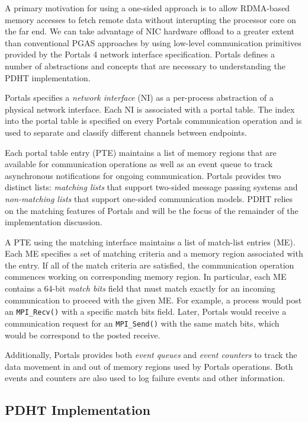 A primary motivation for using a one-sided approach is to allow
RDMA-based memory accesses to fetch remote data without interupting
the processor core on the far end. We can take advantage of NIC
hardware offload to a greater extent than conventional PGAS approaches
by using low-level communication primitives provided by the Portals 4
network interface specification. Portals defines a number of
abstractions and concepts that are necessary to understanding the PDHT
implementation.

Portals specifies a {\em network interface} (NI) as a per-process
abstraction of a physical network interface. Each NI is associated
with a portal table. The index into the portal table is specified on
every Portals communication operation and is used to separate and
classify different channels between endpoints.

Each portal table entry (PTE) maintains a list of memory regions that are
available for communication operations as well as an event queue to
track asynchronous notifications for ongoing communication. Portals
provides two distinct lists: {\em matching lists} that support
two-sided message passing systems and {\em non-matching lists} that
support one-sided communication models. PDHT relies on the matching
features of Portals and will be the focus of the remainder of the
implementation discussion.

A PTE using the matching interface maintains a list of match-list
entries (ME). Each ME specifies a set of matching criteria and a
memory region associated with the entry. If all of the match criteria
are satisfied, the communication operation commences working on
corresponding memory region. In particular, each ME contains a 64-bit
{\em match bits} field that must match exactly for an incoming
communication to proceed with the given ME. For example, a process
would post an {\tt MPI\_Recv()} with a specific match bits
field. Later, Portals would receive a communication request for an
{\tt MPI\_Send()} with the same match bits, which would be correspond
to the posted receive.

Additionally, Portals provides both {\em event queues} and {\em event
  counters} to track the data movement in and out of memory regions
used by Portals operations. Both events and counters are also used to
log failure events and other information.


\subsection{PDHT Implementation}


